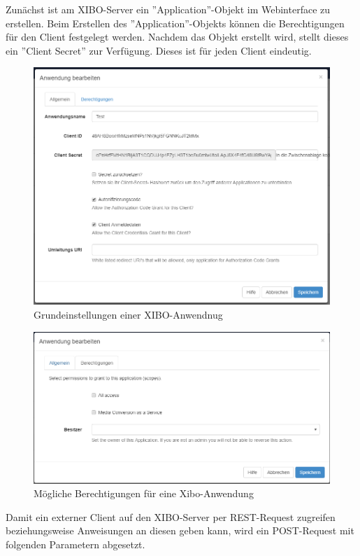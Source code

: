 Zunächst ist am XIBO-Server ein ''Application''-Objekt im Webinterface zu erstellen. Beim Erstellen des ''Application''-Objekts können die Berechtigungen für den Client festgelegt werden. Nachdem das Objekt erstellt wird, stellt dieses ein ''Client Secret'' zur Verfügung. Dieses ist für jeden Client eindeutig.
\begin{figure}[H]
\centering
\includegraphics[width=1.0\textwidth]{images/03_XIBO-Server/03_EditApplikation}
\caption{Grundeinstellungen einer XIBO-Anwendnug}
\label{fig:mediaNav}
\end{figure}
\begin{figure}[H]
\centering
\includegraphics[width=1.0\textwidth]{images/03_XIBO-Server/03_ApplikationPermission}
\caption{Mögliche Berechtigungen für eine Xibo-Anwendung}
\label{fig:mediaNav}
\end{figure}

Damit ein externer Client auf den XIBO-Server per REST-Request zugreifen beziehungsweise Anweisungen an diesen geben kann, wird ein POST-Request mit folgenden Parametern abgesetzt.


